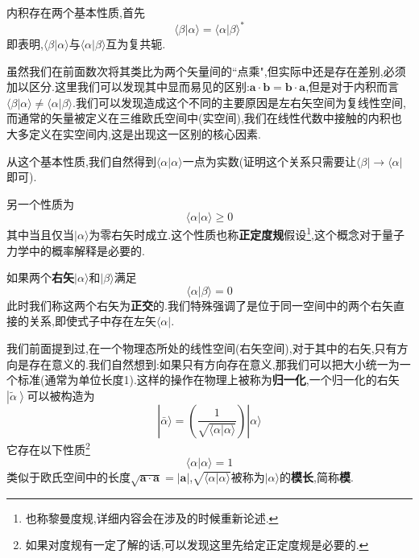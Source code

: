 \documentclass[lang=cn,newtx,10pt,scheme=chinese,thmcnt=section]{elegantbook}
\begin{document}
内积存在两个基本性质,首先
\begin{equation}\label{eq1.9}
	\langle\beta|\alpha\rangle=\langle\alpha|\beta\rangle^*
\end{equation}
即表明,$\langle\beta|\alpha\rangle$与$\langle\alpha|\beta\rangle$互为复共轭.\\
\begin{remark}
	虽然我们在前面数次将其类比为两个矢量间的``点乘",但实际中还是存在差别,必须加以区分.这里我们可以发现其中显而易见的区别:$\mathbf{a}\cdot\mathbf{b}=\mathbf{b}\cdot\mathbf{a}$,但是对于内积而言$\langle\beta|\alpha\rangle\ne\langle\alpha|\beta\rangle$.我们可以发现造成这个不同的主要原因是左右矢空间为复线性空间,而通常的矢量被定义在三维欧氏空间中(实空间),我们在线性代数中接触的内积也大多定义在实空间内,这是出现这一区别的核心因素.
\end{remark}

从这个基本性质,我们自然得到$\langle\alpha|\alpha\rangle$一点为实数(证明这个关系只需要让$\langle\beta|\rightarrow\langle\alpha|$即可).

另一个性质为
\begin{equation}
	\langle\alpha|\alpha\rangle\geqslant0
\end{equation}
其中当且仅当$|\alpha\rangle$为零右矢时成立.这个性质也称\textbf{正定度规}假设\footnote{也称黎曼度规,详细内容会在涉及的时候重新论述.},这个概念对于量子力学中的概率解释是必要的.

如果两个\textbf{右矢}$|\alpha\rangle$和$|\beta\rangle$满足
\begin{equation}
	\langle\alpha|\beta\rangle=0
\end{equation}
此时我们称这两个右矢为\textbf{正交}的.我们特殊强调了是位于同一空间中的两个右矢直接的关系,即使式子中存在左矢$\langle\alpha|$.

我们前面提到过,在一个物理态所处的线性空间(右矢空间),对于其中的右矢,只有方向是存在意义的.我们自然想到:如果只有方向存在意义,那我们可以把大小统一为一个标准(通常为单位长度1).这样的操作在物理上被称为\textbf{归一化},一个归一化的右矢$\left|\tilde{\alpha}\right\rangle $可以被构造为
\begin{equation}
	|\bar{\alpha}\rangle=\left(\frac1{\sqrt{\langle\alpha|\alpha\rangle}}\right)|\alpha\rangle
\end{equation}
它存在以下性质\footnote{如果对度规有一定了解的话,可以发现这里先给定正定度规是必要的.}
\begin{equation}
	\langle\alpha|\alpha\rangle=1
\end{equation}
类似于欧氏空间中的长度$\sqrt{\mathbf{a}\cdot\mathbf{a}}=|\mathbf{a}|$,$\sqrt{\langle\alpha|\alpha\rangle}$被称为$|\alpha\rangle$的\textbf{模长},简称\textbf{模}.
\end{document}
